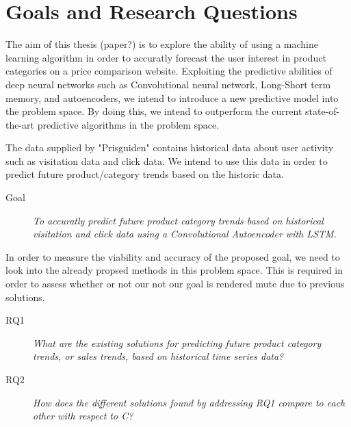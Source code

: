 \section{Goals and Research Questions}
\label{section:Introduction:Goal}


The aim of this thesis (paper?) is to explore the ability of using a machine learning algorithm in order to accuratly forecast the user interest in product categories on a price comparison website.
Exploiting the predictive abilities of deep neural networks such as Convolutional neural network, Long-Short term memory, and autoencoders,
we intend to introduce a new predictive model into the problem space.
By doing this, we intend to outperform the current state-of-the-art predictive algorithms in the problem space.

The data supplied by "Prisguiden" contains historical data about user activity such as visitation data and click data.
We intend to use this data in order to predict future product/category trends based on the historic data.

\begin{description}
    \item[Goal]{\it To accuratly predict future product category trends based on historical visitation and click data using a Convolutional Autoencoder with LSTM.}
\end{description}

In order to measure the viability and accuracy of the proposed goal, we need to look into the already propsed methods in this problem space.
This is required in order to assess whether or not our not our goal is rendered mute due to previous solutions.


\begin{description}
    \item[RQ1]{\it What are the existing solutions for predicting future product category trends, or sales trends, based on historical time series data?}
\end{description}

\begin{description}
    \item[RQ2]{\it How does the different solutions found by addressing RQ1 compare to each other with respect to C?} 
\end{description}

